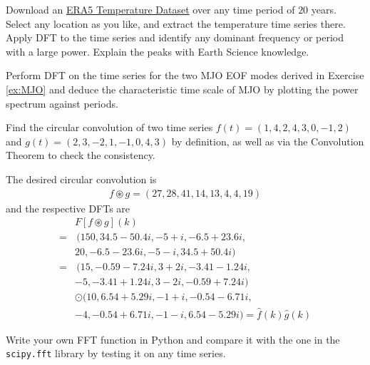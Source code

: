 \begin{Exercise}
Download an \href{https://cds.climate.copernicus.eu/datasets/reanalysis-era5-single-levels?tab=download}{ERA5 Temperature Dataset} over any time period of $20$ years. Select any location as you like, and extract the temperature time series there. Apply DFT to the time series and identify any dominant frequency or period with a large power. Explain the peaks with Earth Science knowledge.
\end{Exercise}

\begin{Exercise}
Perform DFT on the time series for the two MJO EOF modes derived in Exercise \ref{ex:MJO} and deduce the characteristic time scale of MJO by plotting the power spectrum against periods.
\end{Exercise}

\begin{Exercise}
Find the circular convolution of two time series $f(t) = (1,4,2,4, \allowbreak 3,0,-1,2)$ and $g(t) = (2,3,-2,1,-1,0,4,3)$ by definition, as well as via the Convolution Theorem to check the consistency.
\end{Exercise}
\begin{Answer}
The desired circular convolution is
\begin{align*}
f \circledast g = (27, 28, 41, 14, 13, 4, 4, 19)
\end{align*}
and the respective DFTs are
\begin{align*}
& F[f \circledast g](k) \\
=&\, (150, 34.5-50.4i, -5+i, -6.5+23.6i, \\
& 20, -6.5-23.6i, -5-i, 34.5+50.4i) \\
=&\, (15, -0.59-7.24i, 3+2i, -3.41-1.24i, \\
& {-5}, -3.41+1.24i, 3-2i, -0.59+7.24i) \\
& \odot (10, 6.54+5.29i, -1+i, -0.54-6.71i, \\
& {-4}, -0.54+6.71i, -1-i, 6.54-5.29i) = \hat{f}(k)\hat{g}(k)
\end{align*}
\end{Answer}

\begin{Exercise}
Write your own FFT function in Python and compare it with the one in the \verb|scipy.fft| library by testing it on any time series.
\end{Exercise}